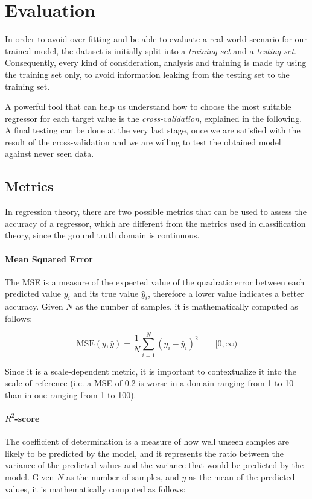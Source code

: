 \section{Evaluation}

In order to avoid over-fitting and be able to evaluate a real-world scenario for our trained model, the dataset is initially split into a \emph{training set} and a \emph{testing set}.
Consequently, every kind of consideration, analysis and training is made by using the training set only, to avoid information leaking from the testing set to the training set.

A powerful tool that can help us understand how to choose the most suitable regressor for each target value is the \emph{cross-validation}, explained in the following.
A final testing can be done at the very last stage, once we are satisfied with the result of the cross-validation and we are willing to test the obtained model against never seen data.

\subsection{Metrics}

In regression theory, there are two possible metrics that can be used to assess the accuracy of a regressor, which are different from the metrics used in classification theory, since the ground truth domain is continuous.

\paragraph{Mean Squared Error}
The MSE is a measure of the expected value of the quadratic error between each predicted value $y_i$ and its true value $\hat{y}_i$, therefore a lower value indicates a better accuracy.
Given $N$ as the number of samples, it is mathematically computed as follows:

\[
	\text{MSE}(y, \hat{y}) = \frac{1}{N} \sum_{i=1}^{N} (y_i - \hat{y}_i)^2
	\qquad [0, \infty)
\]

Since it is a scale-dependent metric, it is important to contextualize it into the scale of reference (i.e. a MSE of 0.2 is worse in a domain ranging from 1 to 10 than in one ranging from 1 to 100).

\paragraph{$R^2$-score}
The coefficient of determination is a measure of how well unseen samples are likely to be predicted by the model, and it represents the ratio between the variance of the predicted values and the variance that would be predicted by the model. Given $N$ as the number of samples, and $\bar{y}$ as the mean of the predicted values, it is mathematically computed as follows:

